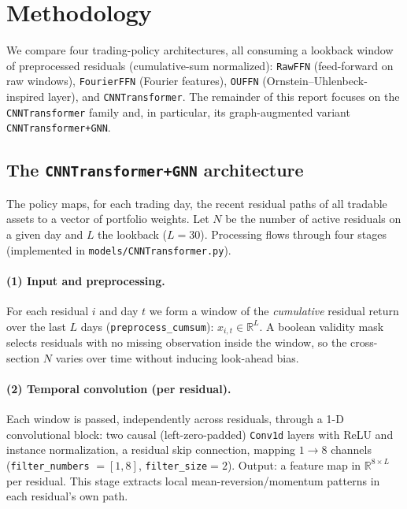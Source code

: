 \documentclass[11pt]{article}
\begin{document}
\section{Methodology}

We compare four trading-policy architectures, all consuming a lookback window of
preprocessed residuals (cumulative-sum normalized): \texttt{RawFFN} (feed-forward on
raw windows), \texttt{FourierFFN} (Fourier features), \texttt{OUFFN}
(Ornstein--Uhlenbeck-inspired layer), and \texttt{CNNTransformer}. The remainder of
this report focuses on the \texttt{CNNTransformer} family and, in particular, its
graph-augmented variant \texttt{CNNTransformer+GNN}.

\subsection{The \texttt{CNNTransformer+GNN} architecture}
The policy maps, for each trading day, the recent residual paths of all tradable
assets to a vector of portfolio weights. Let $N$ be the number of active residuals on
a given day and $L$ the lookback ($L=30$). Processing flows through four stages
(implemented in \texttt{models/CNNTransformer.py}).

\paragraph{(1) Input and preprocessing.} For each residual $i$ and day $t$ we form a
window of the \emph{cumulative} residual return over the last $L$ days
(\texttt{preprocess\_cumsum}): $x_{i,t} \in \mathbb{R}^{L}$. A boolean validity mask
selects residuals with no missing observation inside the window, so the cross-section
$N$ varies over time without inducing look-ahead bias.

\paragraph{(2) Temporal convolution (per residual).} Each window is passed,
independently across residuals, through a 1-D convolutional block: two causal
(left-zero-padded) \texttt{Conv1d} layers with ReLU and instance normalization, a
residual skip connection, mapping $1\!\to\!8$ channels (\texttt{filter\_numbers}
$=[1,8]$, \texttt{filter\_size}$=2$). Output: a feature map in $\mathbb{R}^{8\times L}$
per residual. This stage extracts local mean-reversion/momentum patterns in each
residual's own path.
\end{document}

